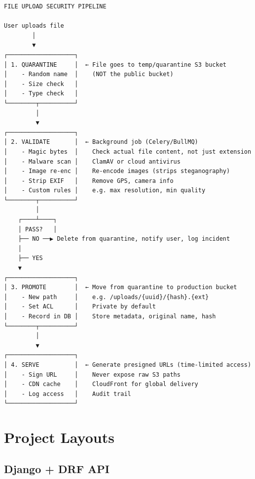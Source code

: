 \documentclass[10pt, a4paper]{article}
\begin{document}
\begin{lstlisting}
FILE UPLOAD SECURITY PIPELINE

User uploads file
        │
        ▼
┌───────────────────┐
│ 1. QUARANTINE     │  ← File goes to temp/quarantine S3 bucket
│    - Random name  │    (NOT the public bucket)
│    - Size check   │
│    - Type check   │
└────────┬──────────┘
         │
         ▼
┌───────────────────┐
│ 2. VALIDATE       │  ← Background job (Celery/BullMQ)
│    - Magic bytes  │    Check actual file content, not just extension
│    - Malware scan │    ClamAV or cloud antivirus
│    - Image re-enc │    Re-encode images (strips steganography)
│    - Strip EXIF   │    Remove GPS, camera info
│    - Custom rules │    e.g. max resolution, min quality
└────────┬──────────┘
         │
    ┌────┴────┐
    │ PASS?   │
    ├── NO ──▶ Delete from quarantine, notify user, log incident
    │
    ├── YES
    ▼
┌───────────────────┐
│ 3. PROMOTE        │  ← Move from quarantine to production bucket
│    - New path     │    e.g. /uploads/{uuid}/{hash}.{ext}
│    - Set ACL      │    Private by default
│    - Record in DB │    Store metadata, original name, hash
└────────┬──────────┘
         │
         ▼
┌───────────────────┐
│ 4. SERVE          │  ← Generate presigned URLs (time-limited access)
│    - Sign URL     │    Never expose raw S3 paths
│    - CDN cache    │    CloudFront for global delivery
│    - Log access   │    Audit trail
└───────────────────┘
\end{lstlisting}


\bigskip


\section{Project Layouts}


\subsection{Django + DRF API}
\end{document}

